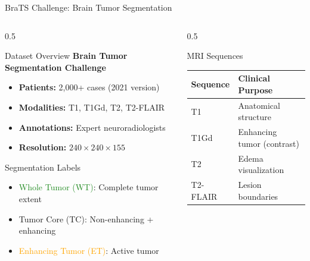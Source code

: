 \documentclass[aspectratio=169]{beamer}
\begin{document}
\begin{frame}{BraTS Challenge: Brain Tumor Segmentation}
    \begin{columns}
        \begin{column}{0.5\textwidth}
            \begin{block}{Dataset Overview}
                \textbf{Brain Tumor Segmentation Challenge}
                \begin{itemize}
                    \item \textbf{Patients:} 2,000+ cases (2021 version)
                    \item \textbf{Modalities:} T1, T1Gd, T2, T2-FLAIR
                    \item \textbf{Annotations:} Expert neuroradiologists
                    \item \textbf{Resolution:} $240 \times 240 \times 155$
                \end{itemize}
            \end{block}
            
            \begin{block}{Segmentation Labels}
                \begin{itemize}
                    \item \textcolor{ForestGreen}{Whole Tumor (WT)}: Complete tumor extent
                    \item \textcolor{BrickRed}{Tumor Core (TC)}: Non-enhancing + enhancing
                    \item \textcolor{Orange}{Enhancing Tumor (ET)}: Active tumor
                \end{itemize}
            \end{block}
        \end{column}
        \begin{column}{0.5\textwidth}
            \begin{block}{MRI Sequences}
                \begin{center}
                    \begin{tabular}{lp{5cm}}
                        \toprule
                        \textbf{Sequence} & \textbf{Clinical Purpose} \\
                        \midrule
                        T1 & Anatomical structure \\
                        T1Gd & Enhancing tumor (contrast) \\
                        T2 & Edema visualization \\
                        T2-FLAIR & Lesion boundaries \\
                        \bottomrule
                    \end{tabular}
                \end{center}
            \end{block}
            

\end{column}
\end{columns}
\end{frame}
\end{document}
